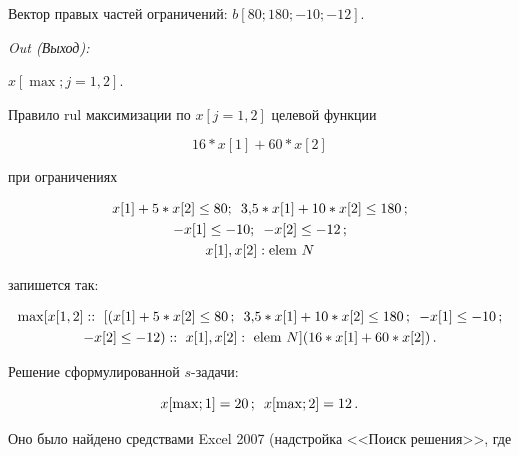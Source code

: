 \noindent


Вектор правых частей ограничений: $b[80; 180; -10; -12]$.





\pagebreak





  \textit{Out (Выход):}





\noindent


$x[\max; j=1, 2]$.





  Правило rul максимизации по $x[j=1, 2]$ целевой функции


$$


16 * x[1] +60 *  x[2]


$$


при ограничениях


\begin{gather*}


x[1] + 5 *x[2] \leq  80;\enskip 3{,}5*x[1] +10*x[2] \leq 180\,; \\


-x[1] \leq -10;\enskip  -x[2] \leq -12\,;\\


x[1], x[2]: \mathrm{elem}~N


\end{gather*}


запишется так:


\begin{multline*}


\max [x[1, 2]::\ [(x[1] + 5* x[2] \leq 80\,;\enskip  3{,}5*x[1] +10*x[2] \leq 180\,;\enskip


-x[1] \leq -10\,;\\


-x[2] \leq -12)::\ x[1], x[2]:\ \mathrm{elem}~N] (16*x[1] +60* x[2])\,.


\end{multline*}





  Решение сформулированной $s$-задачи:


  $$


x [\max;1] = 20\,;\enskip  x [\max;2] = 12\,.


$$


  Оно было найдено средствами Excel 2007 (надстройка <<Поиск решения>>, где


